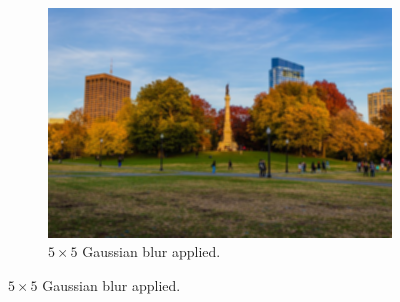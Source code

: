 \documentclass{article}
\begin{document}
\begin{example}
\begin{figure}[H]
        \begin{subfigure}[b]{0.32\textwidth}
        \centering
            \includegraphics[width=\textwidth]{img/03_CNN/Gaussian_Blur.png}
            \caption{$5 \times 5$ Gaussian blur applied. }
            \label{fig:normal_blur_image}
        \end{subfigure}
        

\end{figure}
\end{example}
\end{document}
